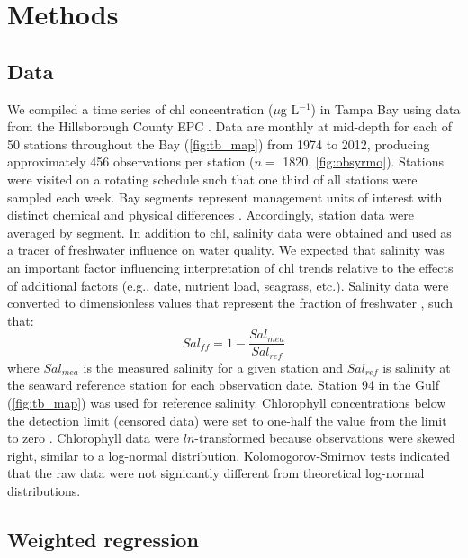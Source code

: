 \documentclass[letterpaper,12pt,oneside]{article}\usepackage[]{graphicx}\usepackage[]{color}
\newcommand{\mugl}{$\mu$g L$^{-1}$}
\begin{document}
\section{Methods}

\subsection{Data}

We compiled a time series of \ac{chl} concentration (\mugl) in Tampa Bay using data from the Hillsborough County \ac{EPC} .  Data are monthly at mid-depth for each of 50 stations throughout the Bay (\cref{fig:tb_map}) from 1974 to 2012, producing approximately 456 observations per station ($n=$ 1820, \cref{fig:obsyrmo}).  Stations were visited on a rotating schedule such that one third of all stations were sampled each week.  Bay segments represent management units of interest with distinct chemical and physical differences \citep[\cref{tab:segsum},][]{Lewis85}.  Accordingly, station data were averaged by segment.  In addition to \ac{chl}, salinity data were obtained and used as a tracer of freshwater influence on water quality.  We expected that salinity was an important factor influencing interpretation of \ac{chl} trends relative to the effects of additional factors (e.g., date, nutrient load, seagrass, etc.).  Salinity data were converted to dimensionless values that represent the fraction of freshwater \citep{Dyer73}, such that:
\begin{equation}
Sal_{ff} = 1 - \frac{Sal_{mea}}{Sal_{ref}}
\end{equation}
\noindent where $Sal_{mea}$ is the measured salinity for a given station and $Sal_{ref}$ is salinity at the seaward reference station for each observation date.  Station 94 in the Gulf (\cref{fig:tb_map}) was used for reference salinity.  Chlorophyll concentrations below the detection limit (censored data) were set to one-half the value from the limit to zero \citep{Gilbert87}.  Chlorophyll data were $ln$-transformed because observations were skewed right, similar to a log-normal distribution.  Kolomogorov-Smirnov tests indicated that the raw data were not signicantly different from theoretical log-normal distributions.

\subsection{Weighted regression}
\end{document}
